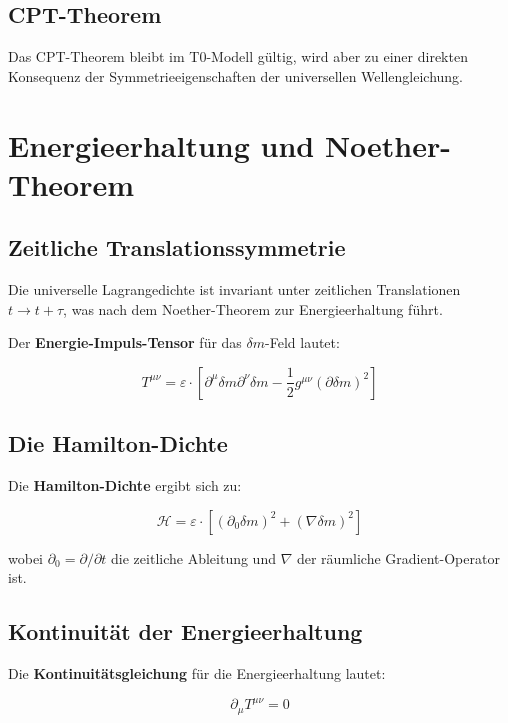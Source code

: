 \documentclass[12pt,a4paper]{report}
\begin{document}
	\subsection{CPT-Theorem}
	
	Das CPT-Theorem bleibt im T0-Modell gültig, wird aber zu einer direkten Konsequenz der Symmetrieeigenschaften der universellen Wellengleichung.
	
	\section{Energieerhaltung und Noether-Theorem}
	
	\subsection{Zeitliche Translationssymmetrie}
	
	Die universelle Lagrangedichte ist invariant unter zeitlichen Translationen $t \to t + \tau$, was nach dem Noether-Theorem zur Energieerhaltung führt.
	
	Der \textbf{Energie-Impuls-Tensor} für das $\delta m$-Feld lautet:
	
	\begin{equation}
		T^{\mu\nu} = \varepsilon \cdot [\partial^\mu\delta m \partial^\nu\delta m - \frac{1}{2}g^{\mu\nu} (\partial\delta m)^2]
	\end{equation}
	
	\subsection{Die Hamilton-Dichte}
	
	Die \textbf{Hamilton-Dichte} ergibt sich zu:
	
	\begin{equation}
		\mathcal{H} = \varepsilon \cdot [(\partial_0\delta m)^2 + (\nabla\delta m)^2]
	\end{equation}
	
	wobei $\partial_0 = \partial/\partial t$ die zeitliche Ableitung und $\nabla$ der räumliche Gradient-Operator ist.
	
	\subsection{Kontinuität der Energieerhaltung}
	
	Die \textbf{Kontinuitätsgleichung} für die Energieerhaltung lautet:
	
	\begin{equation}
		\partial_\mu T^{\mu\nu} = 0
	\end{equation}
	
\end{document}
